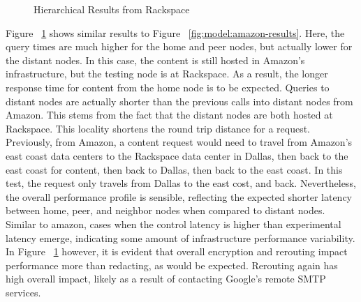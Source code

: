 
\begin{figure}[htbp]
\begin{minipage}[b]{0.5\linewidth}
\centering
{}
\end{minipage}
\begin{minipage}[b]{0.5\linewidth}
\centering
{}
\end{minipage}
\caption{Hierarchical Results from Rackspace}
\label{fig:model:rackspace-results}
\end{figure}

Figure ~\ref{fig:model:rackspace-results} shows similar results to Figure ~\ref{fig:model:amazon-results}.  Here, the query times are much higher for the home and peer nodes, but actually lower for the distant nodes.  In this case, the content is still hosted in Amazon's infrastructure, but the testing node is at Rackspace.  As a result, the longer response time for content from the home node is to be expected.  Queries to distant nodes are actually shorter than the previous calls into distant nodes from Amazon.  This stems from the fact that the distant nodes are both hosted at Rackspace.  This locality shortens the round trip distance for a request.  Previously, from Amazon, a content request would need to travel from Amazon's east coast data centers to the Rackspace data center in Dallas, then back to the east coast for content, then back to Dallas, then back to the east coast.  In this test, the request only travels from Dallas to the east cost, and back.  Nevertheless, the overall performance profile is sensible, reflecting the expected shorter latency between home, peer, and neighbor nodes when compared to distant nodes.  Similar to amazon, cases when the control latency is higher than experimental latency emerge, indicating some amount of infrastructure performance variability.  In Figure ~\ref{fig:model:rackspace-results} however, it is evident that overall encryption and rerouting impact performance more than redacting, as would be expected.  Rerouting again has high overall impact, likely as a result of contacting Google's remote SMTP services.

